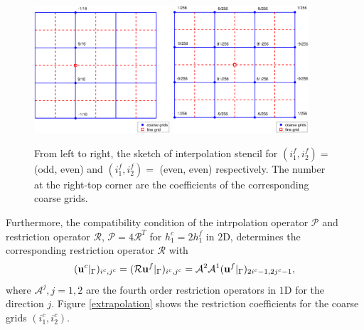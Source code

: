 \documentclass[a4paper]{article}
\begin{document}
\begin{figure}[H]
	\centering
	\includegraphics[width=0.45\textwidth]{interpolation3.eps}
	\includegraphics[width=0.45\textwidth]{interpolation4.eps}
	\caption{\scriptsize{From left to right, the sketch of interpolation stencil for $(i_1^f,i_2^f) =$ (odd, even) and $(i_1^f,i_2^f) =$ (even, even) respectively. The number at the right-top corner are the coefficients of the corresponding coarse grids.}}\label{interpolation_3_4}
\end{figure}

Furthermore, the compatibility condition of the intrpolation operator $\mathcal{P}$ and restriction operator $\mathcal{R}$, $\mathcal{P} = 4\mathcal{R}^T$ for $h_1^c = 2h_1^f$ in $2$D, determines the corresponding restriction operator $\mathcal{R}$ with
\begin{equation}\label{restriction}
({\bf u}^c|_{\Gamma})_{i^c,j^c} = (\mathcal{R}{\bf u}^f|_{\Gamma})_{i^c,j^c} = \mathcal{A}^2\mathcal{A}^1 ({\bf u}^f|_{\Gamma})_{2i^c-1,2j^c-1},
\end{equation}
where $\mathcal{A}^j, j = 1,2$ are the fourth order restriction operators in $1$D for the direction $j$. Figure \ref{extrapolation} shows the restriction coefficients for the coarse grids $(i_1^c,i_2^c)$.
\end{document}
